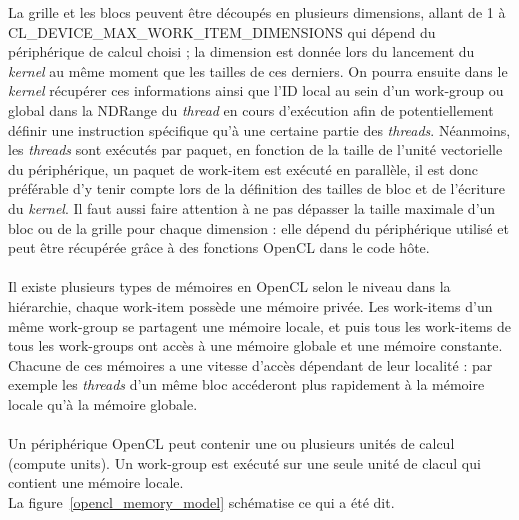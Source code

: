 La grille et les blocs peuvent être découpés en plusieurs dimensions, allant de
1 à \og{} CL\_DEVICE\_MAX\_WORK\_ITEM\_DIMENSIONS \fg{} qui dépend du
périphérique de calcul choisi ; la dimension est donnée lors du lancement du
\emph{kernel} au même moment que les tailles de ces derniers. On pourra ensuite
dans le \emph{kernel} récupérer ces informations ainsi que l'ID local au sein
d'un work-group ou global dans la NDRange du \emph{thread} en cours d'exécution
afin de potentiellement définir une instruction spécifique qu'à une certaine
partie des \emph{threads}. Néanmoins, les \emph{threads} sont exécutés par
paquet, en fonction de la taille de l'unité vectorielle du périphérique, un
paquet de work-item est exécuté en parallèle, il est donc préférable d'y tenir
compte lors de la définition des tailles de bloc et de l'écriture du
\emph{kernel}. Il faut aussi faire attention à ne pas dépasser la taille
maximale d'un bloc ou de la grille pour chaque dimension : elle dépend du
périphérique utilisé et peut être récupérée grâce à des fonctions OpenCL dans le
code hôte.

\paragraph{}
Il existe plusieurs types de mémoires en OpenCL selon le niveau dans la
hiérarchie, chaque work-item possède une mémoire privée. Les work-items d'un
même work-group se partagent une mémoire locale, et puis tous les work-items de
tous les work-groups ont accès à une mémoire globale et une mémoire constante.
Chacune de ces mémoires a une vitesse d'accès dépendant de leur localité : par
exemple les \emph{threads} d'un même bloc accéderont plus rapidement à la
mémoire locale qu'à la mémoire globale.

\paragraph{}
Un périphérique OpenCL peut contenir une ou plusieurs unités de calcul (compute
units). Un work-group est exécuté sur une seule unité de clacul qui contient une
mémoire locale.\\
La figure~\ref{opencl_memory_model} schématise ce qui a été dit.

